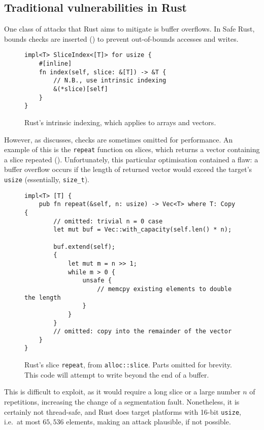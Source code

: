 \documentclass[dissertation.tex]{subfiles}
\begin{document}
\subsection{Traditional vulnerabilities in Rust}
\label{sec:rust-vulns}


One class of attacks that Rust aims to mitigate is buffer overflows.
In Safe Rust, bounds checks are inserted ()
to prevent out-of-bounds accesses and writes.

\begin{figure}[ht]
\begin{lstlisting}
impl<T> SliceIndex<[T]> for usize {
    #[inline]
    fn index(self, slice: &[T]) -> &T {
        // N.B., use intrinsic indexing
        &(*slice)[self]
    }
}
\end{lstlisting}
\caption{ Rust's intrinsic indexing, which applies to
arrays and vectors.}
\label{lst:rust-index}
\end{figure}

However, as  discusses, checks are
sometimes omitted for performance.
An example of this is the \texttt{repeat} function on slices, which
returns a vector containing a slice repeated
().
Unfortunately, this particular optimisation contained a flaw: a buffer
overflow occurs if the length of returned vector would exceed the
target's \texttt{usize} (essentially, \texttt{size\_t}).

\begin{figure}[ht]
\begin{lstlisting}
impl<T> [T] {
    pub fn repeat(&self, n: usize) -> Vec<T> where T: Copy {
        // omitted: trivial n = 0 case
        let mut buf = Vec::with_capacity(self.len() * n);

        buf.extend(self);
        {
            let mut m = n >> 1;
            while m > 0 {
                unsafe {
                    // memcpy existing elements to double the length
                }
            }
        }
        // omitted: copy into the remainder of the vector
    }
}
\end{lstlisting}
\caption{ Rust's slice \texttt{repeat}, from
\texttt{alloc::slice}. Parts omitted for brevity. This code will attempt
to write beyond the end of a buffer.}
\label{lst:slice-repeat}
\end{figure}

This is difficult to exploit, as it would require a long slice or a
large number \(n\) of repetitions, increasing the change of a
segmentation fault.
Nonetheless, it is certainly not thread-safe, and Rust does target
platforms with 16-bit \texttt{usize}, i.e.~at most \(65,536\) elements,
making an attack plausible, if not possible.
\end{document}
